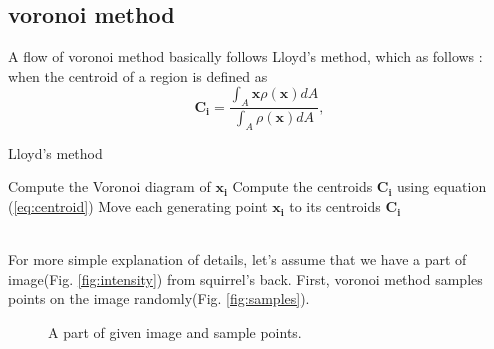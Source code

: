 \documentclass[11pt]{article}
\begin{document}
\subsection{voronoi method}
A flow of voronoi method basically follows Lloyd's method\cite{Okabe:1992:STC:135734}, which as follows : \\ 
when the centroid of a region is defined as
\begin{equation}\label{eq:centroid}
\mathbf{C_i}=\frac{\int_{A}\mathbf{x}\rho(\mathbf{x})dA}{\int_{A}\rho(\mathbf{x})dA},
\end{equation}
\begin{algorithm}
\caption{Lloyd's method}\label{alg:lloyds}
\begin{algorithmic}[1]
    \State Compute the Voronoi diagram of $\mathbf{x_i}$
    \State Compute the centroids $\mathbf{C_i}$ using equation (\ref{eq:centroid})
    \State Move each generating point $\mathbf{x_i}$ to its centroids $\mathbf{C_i}$
\EndWhile
\end{algorithmic}
\end{algorithm}\\
For more simple explanation of details, let's assume that we have a part of image(Fig. \ref{fig:intensity}) from squirrel's back. %
First, voronoi method samples points on the image randomly(Fig. \ref{fig:samples}). %
\begin{figure}[hbt]
 \centering
 \hspace{-3mm}
  \hspace{-3mm}
    \caption{A part of given image and sample points. \label{fig:sampling}}
\end{figure}\\
\end{document}
